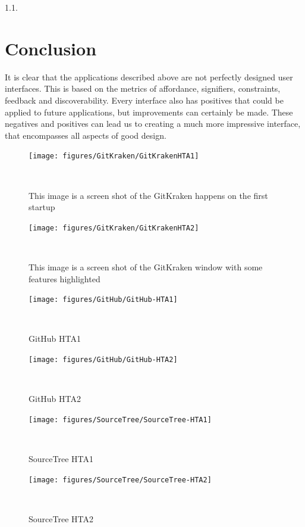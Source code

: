 \documentclass{sigchi}
\begin{document}
1.1. 





\section{Conclusion}
It is clear that the applications described above are not perfectly designed
user interfaces. This is based on the metrics of affordance, signifiers, constraints, feedback and discoverability.
Every interface also has positives that could be applied to future applications, but improvements can certainly be made.
These negatives and positives can lead us to creating a much more impressive interface, that encompasses all 
aspects of good design.


\begin{figure}
  \centering
  \texttt{[image: figures/GitKraken/GitKrakenHTA1]}
  \caption{This image is a screen shot of the GitKraken happens on the first startup}~\label{fig:GitKrakenHTA1}
\end{figure}

\begin{figure}
  \centering
  \texttt{[image: figures/GitKraken/GitKrakenHTA2]}
  \caption{This image is a screen shot of the GitKraken window with some features highlighted}~\label{fig:GitKrakenHTA2}
\end{figure}

\begin{figure}
  \centering
  \texttt{[image: figures/GitHub/GitHub-HTA1]}
  \caption{GitHub HTA1}~\label{fig:GitHubHTA1}
\end{figure}

\begin{figure}
  \centering
  \texttt{[image: figures/GitHub/GitHub-HTA2]}
  \caption{GitHub HTA2}~\label{fig:GitHubHTA2}
\end{figure}

\begin{figure}
  \centering
  \texttt{[image: figures/SourceTree/SourceTree-HTA1]}
  \caption{SourceTree HTA1}~\label{fig:SourceTreeHTA1}
\end{figure}

\begin{figure}
  \centering
  \texttt{[image: figures/SourceTree/SourceTree-HTA2]}
  \caption{SourceTree HTA2}~\label{fig:SourceTreeHTA2}
\end{figure}

\balance{}



\end{document}
